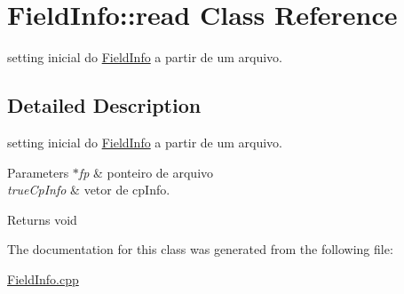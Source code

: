 \hypertarget{class_field_info_1_1read}{}\section{Field\+Info\+:\+:read Class Reference}
\label{class_field_info_1_1read}


setting inicial do \hyperlink{class_field_info}{Field\+Info} a partir de um arquivo.  




\subsection{Detailed Description}
setting inicial do \hyperlink{class_field_info}{Field\+Info} a partir de um arquivo. 


\begin{DoxyParams}{Parameters}
{\em $\ast$fp} & ponteiro de arquivo \\
\hline
{\em true\+Cp\+Info} & vetor de cp\+Info. \\
\hline
\end{DoxyParams}
\begin{DoxyReturn}{Returns}
void 
\end{DoxyReturn}


The documentation for this class was generated from the following file\+:\begin{DoxyCompactItemize}
\item 
\hyperlink{_field_info_8cpp}{Field\+Info.\+cpp}\end{DoxyCompactItemize}
